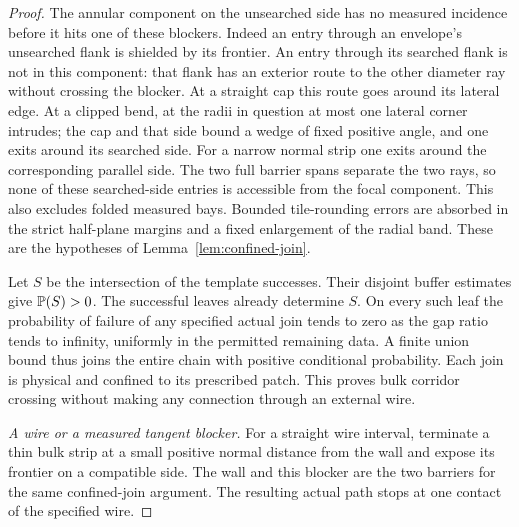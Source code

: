 \begin{proof}
The annular component on the unsearched side has no measured
incidence before it hits one of these blockers. Indeed an entry
through an envelope's unsearched flank is shielded by its frontier.
An entry through its searched flank is not in this component: that
flank has an exterior route to the other diameter ray without crossing
the blocker. At a straight cap this route goes around its lateral
edge. At a clipped bend, at the radii in question at most one lateral
corner intrudes; the cap and that side bound a wedge of fixed positive
angle, and one exits around its searched side. For a narrow normal
strip one exits around the corresponding parallel side. The two full
barrier spans separate the two rays, so none of these searched-side
entries is accessible from the focal component. This also excludes
folded measured bays. Bounded tile-rounding errors are absorbed in
the strict half-plane margins and a fixed enlargement of the radial
band. These are the hypotheses of Lemma~\ref{lem:confined-join}.

Let $S$ be the intersection of the template successes. Their disjoint
buffer estimates give $\mathbb P(S)>0$. The successful leaves already
determine $S$. On every such leaf the probability of failure of any
specified actual join tends to zero as the gap ratio tends to infinity,
uniformly in the permitted remaining data. A finite union bound thus
joins the entire chain with positive conditional probability. Each
join is physical and confined to its prescribed patch. This proves
bulk corridor crossing without making any connection through an
external wire.

\emph{A wire or a measured tangent blocker.}
For a straight wire interval, terminate a thin bulk strip at a small
positive normal distance from the wall and expose its frontier on a
compatible side. The wall and this blocker are the two barriers for
the same confined-join argument. The resulting actual path stops at
one contact of the specified wire.


\end{proof}

